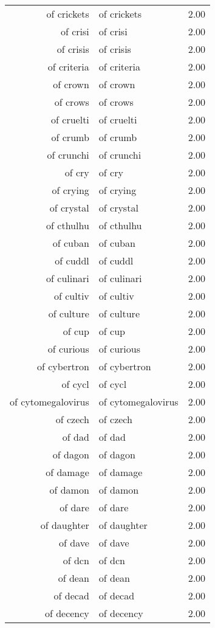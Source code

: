 \begin{table}[ht]
\begin{tabular}{rlr}
  of crickets & of crickets & 2.00 \\ 
  of crisi & of crisi & 2.00 \\ 
  of crisis & of crisis & 2.00 \\ 
  of criteria & of criteria & 2.00 \\ 
  of crown & of crown & 2.00 \\ 
  of crows & of crows & 2.00 \\ 
  of cruelti & of cruelti & 2.00 \\ 
  of crumb & of crumb & 2.00 \\ 
  of crunchi & of crunchi & 2.00 \\ 
  of cry & of cry & 2.00 \\ 
  of crying & of crying & 2.00 \\ 
  of crystal & of crystal & 2.00 \\ 
  of cthulhu & of cthulhu & 2.00 \\ 
  of cuban & of cuban & 2.00 \\ 
  of cuddl & of cuddl & 2.00 \\ 
  of culinari & of culinari & 2.00 \\ 
  of cultiv & of cultiv & 2.00 \\ 
  of culture & of culture & 2.00 \\ 
  of cup & of cup & 2.00 \\ 
  of curious & of curious & 2.00 \\ 
  of cybertron & of cybertron & 2.00 \\ 
  of cycl & of cycl & 2.00 \\ 
  of cytomegalovirus & of cytomegalovirus & 2.00 \\ 
  of czech & of czech & 2.00 \\ 
  of dad & of dad & 2.00 \\ 
  of dagon & of dagon & 2.00 \\ 
  of damage & of damage & 2.00 \\ 
  of damon & of damon & 2.00 \\ 
  of dare & of dare & 2.00 \\ 
  of daughter & of daughter & 2.00 \\ 
  of dave & of dave & 2.00 \\ 
  of dcn & of dcn & 2.00 \\ 
  of dean & of dean & 2.00 \\ 
  of decad & of decad & 2.00 \\ 
  of decency & of decency & 2.00 \\ 

\end{tabular}
\end{table}
